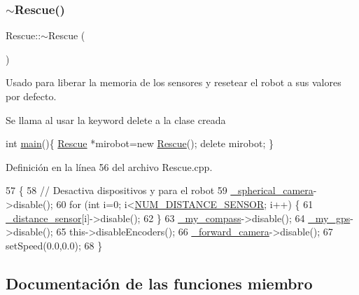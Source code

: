 \subsubsection{\texorpdfstring{$\sim$\+Rescue()}{~Rescue()}}
{\footnotesize\ttfamily Rescue\+::$\sim$\+Rescue (\begin{DoxyParamCaption}{ }\end{DoxyParamCaption})}



Usado para liberar la memoria de los sensores y resetear el robot a sus valores por defecto. 

Se llama al usar la keyword delete a la clase creada 
\begin{DoxyCode}
\textcolor{keywordtype}{int} \hyperlink{Pioneer_8cpp_a3c04138a5bfe5d72780bb7e82a18e627_a3c04138a5bfe5d72780bb7e82a18e627}{main}()\{
  \hyperlink{classRescue}{Rescue} *mirobot=\textcolor{keyword}{new} \hyperlink{classRescue_a307e122659d2fbe9e17f51108951752f_a307e122659d2fbe9e17f51108951752f}{Rescue}();
  \textcolor{keyword}{delete} mirobot; 
\}
\end{DoxyCode}
 

Definición en la línea 56 del archivo Rescue.\+cpp.


\begin{DoxyCode}
57 \{
58     \textcolor{comment}{// Desactiva dispositivos y para el robot}
59     \hyperlink{classRescue_a6f2788baf7717274fc75241b989796bc_a6f2788baf7717274fc75241b989796bc}{\_spherical\_camera}->disable();
60     \textcolor{keywordflow}{for} (\textcolor{keywordtype}{int} i=0; i<\hyperlink{Rescue_8h_a3bfa6c68d124846bd629eef1504b2556_a3bfa6c68d124846bd629eef1504b2556}{NUM\_DISTANCE\_SENSOR}; i++) \{
61         \hyperlink{classRescue_a1e1f6c1dc43593a25989127b6ca89ae9_a1e1f6c1dc43593a25989127b6ca89ae9}{\_distance\_sensor}[i]->disable();
62     \}
63     \hyperlink{classRescue_ab6c7e1a7c7cb23027b1d53aea73697b7_ab6c7e1a7c7cb23027b1d53aea73697b7}{\_my\_compass}->disable();
64     \hyperlink{classRescue_ab3b6799de1bf84d1bf4a85afef8db0b2_ab3b6799de1bf84d1bf4a85afef8db0b2}{\_my\_gps}->disable();
65     this->disableEncoders();
66     \hyperlink{classRescue_a8cc51f98f8203494918ca1d313fca408_a8cc51f98f8203494918ca1d313fca408}{\_forward\_camera}->disable();
67     setSpeed(0.0,0.0);
68 \}
\end{DoxyCode}


\subsection{Documentación de las funciones miembro}
\mbox{\label{classRescue_a9a430924f65d71eca4e02dc9b2704947_a9a430924f65d71eca4e02dc9b2704947}} 
